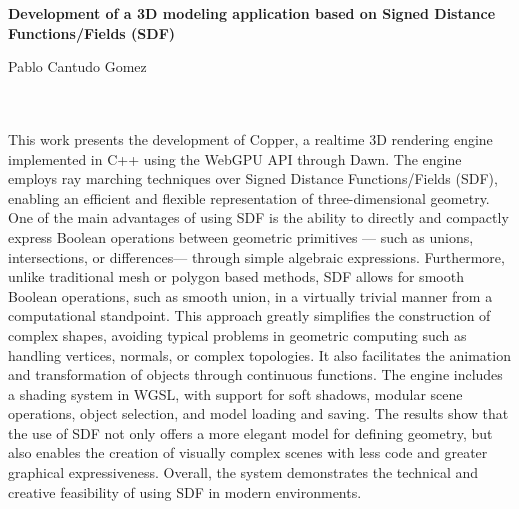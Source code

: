 \thispagestyle{empty}


\begin{center}
{\large\bfseries Development of a 3D modeling application based on Signed
Distance Functions/Fields (SDF)}\\
\end{center}
\begin{center}
Pablo Cantudo Gomez \\
\end{center}

\\

\vspace{0.7cm}
\\

This work presents the development of Copper, a realtime 3D rendering engine implemented in C++ using the WebGPU API through Dawn. The engine employs ray marching techniques over Signed Distance Functions/Fields (SDF), enabling an efficient and flexible representation of three-dimensional geometry. One of the main advantages of using SDF is the ability to directly and compactly express Boolean operations between geometric primitives —
such as unions, intersections, or differences— through simple algebraic expressions. Furthermore, unlike traditional mesh or polygon based methods,
SDF allows for smooth Boolean operations, such as smooth union, in a virtually trivial manner from a computational standpoint.
\bigbreak
This approach greatly simplifies the construction of complex shapes,
avoiding typical problems in geometric computing such as handling vertices, normals, or complex topologies. It also facilitates the animation and
transformation of objects through continuous functions. The engine includes
a shading system in WGSL, with support for soft shadows, modular scene
operations, object selection, and model loading and saving. The results show
that the use of SDF not only offers a more elegant model for defining geometry, but also enables the creation of visually complex scenes with less code
and greater graphical expressiveness. Overall, the system demonstrates the
technical and creative feasibility of using SDF in modern environments.

\chapter*{}
\thispagestyle{empty}


